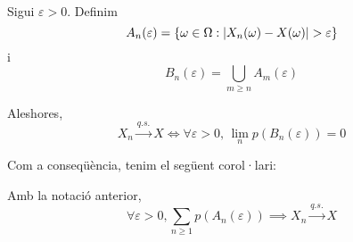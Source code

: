 \begin{lema}
  \-\\
  Sigui $\varepsilon > 0$. Definim $$A_n(\varepsilon) = \left\{\omega \in \Omega : \left\vert X_n(\omega) - X(\omega) \right\vert > \varepsilon\right\}$$ i $$B_n(\varepsilon) = \bigcup_{m\geq n} A_m(\varepsilon)$$
  
  Aleshores,
  \[
    X_n \overset{q.s.}{\to} X \iff \forall \varepsilon > 0, \, \lim_n p(B_n(\varepsilon)) = 0
  \]
\end{lema}

Com a conseqüència, tenim el següent corol·lari:

\begin{col}
  Amb la notació anterior, 
  \[
    \forall \varepsilon > 0, \sum_{n\geq 1}p(A_n(\varepsilon)) \implies X_n \overset{q.s.}{\to} X
  \]
\end{col}

\newpage

